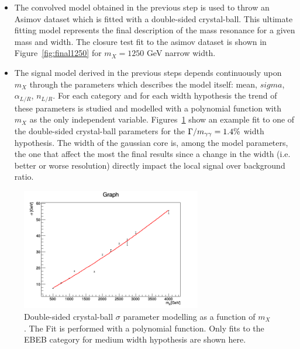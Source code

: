\begin{itemize}
\item The convolved model obtained in the previous step is used to throw an Asimov dataset which is fitted with a double-sided crystal-ball. This ultimate fitting model represents the final description of the mass resonance for a given mass and width. The closure test fit to the asimov dataset is shown in Figure~\ref{fig:final1250} for $m_X=1250$ GeV  narrow width.

\item The signal model derived in the previous steps depends continuously upon  $m_X$ through the parameters which describes the model itself: mean, $sigma$, $\alpha_{L/R}$, $n_{L/R}$. For each category and for each width hypothesis the trend of these parameters is studied and modelled with a polynomial function with $m_X$ as the only independent variable. Figures~\ref{fig:fitmean} show an example fit to one of the  double-sided crystal-ball parameters for the $\Gamma / m_{\gamma\gamma} = 1.4\%$ width hypothesis. The width of the gaussian core is, among the model parameters, the one that affect the most the final results since
  a change in the width (i.e. better or worse resolution) directly impact the local signal over background ratio.

\end{itemize}
  
\begin{figure}[!h]
\begin{center}
  \includegraphics[width=0.7\textwidth]{figures/diphotons/sigmaVsMass_EBEB016.png}
 \caption{Double-sided crystal-ball $\sigma$ parameter modelling as a function of $m_X$. The Fit is performed with a polynomial function. Only fits to the EBEB category for medium width hypothesis are shown here.}
\label{fig:fitmean}
\end{center}
\end{figure}

